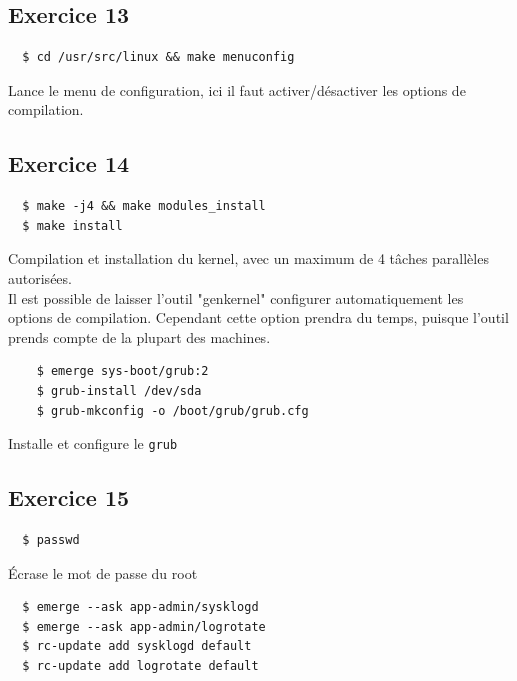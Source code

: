 \documentclass{report}
\begin{document}
\subsection{Exercice 13}
\begin{tcolorbox}
  \begin{verbatim}
  $ cd /usr/src/linux && make menuconfig
  \end{verbatim}
\end{tcolorbox}
Lance le menu de configuration, ici il faut activer/désactiver les options de compilation.

\subsection{Exercice 14}
\begin{tcolorbox}
  \begin{verbatim}
  $ make -j4 && make modules_install
  $ make install
  \end{verbatim}
\end{tcolorbox}
Compilation et installation du kernel, avec un maximum de 4 tâches parallèles autorisées.
\\
Il est possible de laisser l'outil "genkernel" configurer automatiquement les options de compilation.
Cependant cette option prendra du temps, puisque l'outil prends compte de la plupart des machines.
\begin{tcolorbox}
  \begin{verbatim}
    $ emerge sys-boot/grub:2
    $ grub-install /dev/sda
    $ grub-mkconfig -o /boot/grub/grub.cfg
  \end{verbatim}
\end{tcolorbox}

Installe et configure le \texttt{grub}
\subsection{Exercice 15}
\begin{tcolorbox}
  \begin{verbatim}
  $ passwd
  \end{verbatim}
\end{tcolorbox}
Écrase le mot de passe du root

\begin{tcolorbox}
  \begin{verbatim}
  $ emerge --ask app-admin/sysklogd
  $ emerge --ask app-admin/logrotate
  $ rc-update add sysklogd default
  $ rc-update add logrotate default
  \end{verbatim}
\end{tcolorbox}
\end{document}
